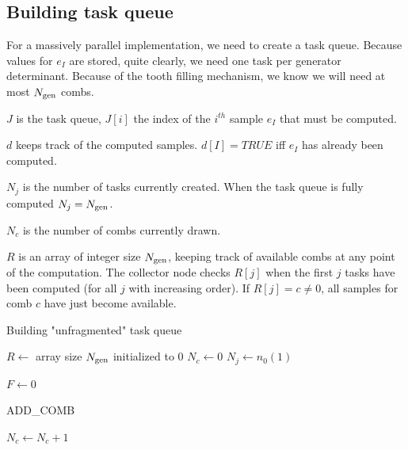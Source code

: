 \documentclass[./thesis.tex]{subfiles}
\begin{document}
\subsection{Building task queue}

For a massively parallel implementation, we need to create a task queue. Because values for $e_I$ are stored, quite clearly, we need one task per generator determinant. Because of the tooth filling mechanism, we know we will need at most ${N_\text{gen}}$ combs.
\begin{description}
\item{$J$} is the task queue, $J[i]$ the index of the $i^{th}$ sample $e_I$ that must be computed.
\item{$d$} keeps track of the computed samples. $d[I] = TRUE$ iff $e_I$ has already been computed.
\item{$N_j$} is the number of tasks currently created. When the task queue is fully computed $N_j = {N_\text{gen}}$.
\item{$N_c$} is the number of combs currently drawn.
\item{$R$} is an array of integer size ${N_\text{gen}}$, keeping track of available combs at any point of the computation. The collector node checks $R[j]$ when the first $j$ tasks have been computed (for all $j$ with increasing order). If $R[j] = c \neq 0$, all samples for comb $c$ have just become available. 
\end{description}



\begin{algorithm}
	\caption{Building "unfragmented" task queue}
	\label{alg:TASK_QUEUE}
	$R \gets $ array size ${N_\text{gen}}$ initialized to 0 \;
	$N_c \gets 0$ \;
	$N_j \gets n_0(1)$ \;
	
	
	\For{$i=1,\Ngen$}{
		$u[i] \gets $ random value in $[0,1)_\mathbb{R}$ \;	
	}
	$F \gets 0$ \;	
\end{algorithm}

\begin{algorithm}
	\caption{ADD\_COMB}
	\label{alg:ADD_COMB}
		$N_c \gets N_c + 1$ \;
\end{algorithm}
\end{document}
